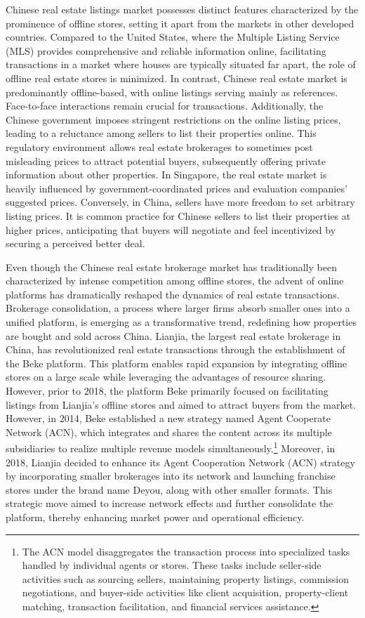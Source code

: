 \documentclass[11pt]{article}
\begin{document}
Chinese real estate listings market possesses distinct features characterized by the prominence of offline stores, setting it apart from the markets in other developed countries. Compared to the United States, where the Multiple Listing Service (MLS) provides comprehensive and reliable information online, facilitating transactions in a market where houses are typically situated far apart, the role of offline real estate stores is minimized. In contrast, Chinese real estate market is predominantly offline-based, with online listings serving mainly as references. Face-to-face interactions remain crucial for transactions. Additionally, the Chinese government imposes stringent restrictions on the online listing prices, leading to a reluctance among sellers to list their properties online. This regulatory environment allows real estate brokerages to sometimes post misleading prices to attract potential buyers, subsequently offering private information about other properties. In Singapore, the real estate market is heavily influenced by government-coordinated prices and evaluation companies' suggested prices. Conversely, in China, sellers have more freedom to set arbitrary listing prices. It is common practice for Chinese sellers to list their properties at higher prices, anticipating that buyers will negotiate and feel incentivized by securing a perceived better deal.

Even though the Chinese real estate brokerage market has traditionally been characterized by intense competition among offline stores, the advent of online platforms has dramatically reshaped the dynamics of real estate transactions. Brokerage consolidation, a process where larger firms absorb smaller ones into a unified platform, is emerging as a transformative trend, redefining how properties are bought and sold across China. Lianjia, the largest real estate brokerage in China, has revolutionized real estate transactions through the establishment of the Beke platform. This platform enables rapid expansion by integrating offline stores on a large scale while leveraging the advantages of resource sharing. However, prior to 2018, the platform Beke primarily focused on facilitating listings from Lianjia's offline stores and aimed to attract buyers from the market. However, in 2014, Beke established a new strategy named Agent Cooperate Network (ACN), which integrates and shares the content across its multiple subsidiaries to realize multiple revenue models simultaneously.\footnote{The ACN model disaggregates the transaction process into specialized tasks handled by individual agents or stores. These tasks include seller-side activities such as sourcing sellers, maintaining property listings, commission negotiations, and buyer-side activities like client acquisition, property-client matching, transaction facilitation, and financial services assistance.} Moreover, in 2018, Lianjia decided to enhance its Agent Cooperation Network (ACN) strategy by incorporating smaller brokerages into its network and launching franchise stores under the brand name Deyou, along with other smaller formats. This strategic move aimed to increase network effects and further consolidate the platform, thereby enhancing market power and operational efficiency.
\end{document}

